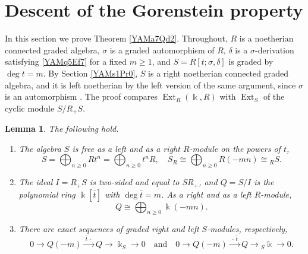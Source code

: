\documentclass[reqno]{amsart}
\numberwithin{equation}{section}
\newtheorem{lemma}[equation]{Lemma}
\theoremstyle{definition}
\theoremstyle{remark}
\theoremstyle{plain}
\newcommand{\kk}{\Bbbk}
\DeclareMathOperator{\Ext}{Ext}
\begin{document}
\section{Descent of the Gorenstein property}\label{YAMs1Pz4}

In this section we prove Theorem \ref{YAMa7Qd2}. Throughout, $R$ is a noetherian connected graded algebra, $\sigma$ is a graded automorphism of $R$, $\delta$ is a $\sigma$-derivation satisfying \eqref{YAMq5Ef7} for a fixed $m\ge1$, and $S=R[t;\sigma,\delta]$ is graded by $\deg t=m$. By Section \ref{YAMs1Pr0}, $S$ is a right noetherian connected graded algebra, and it is left noetherian by the left version of the same argument, since $\sigma$ is an automorphism \cite[Theorem 1.2.9]{MR}. The proof compares $\Ext_R(\kk,R)$ with $\Ext_S$ of the cyclic module $S/R_+S$.

\begin{lemma}\label{YAMl5Gd0}
The following hold.
\begin{enumerate}
\item The algebra $S$ is free as a left and as a right $R$-module on the powers of $t$,
\begin{equation}\label{YAMe15Fr6}
S=\bigoplus_{n\ge0}Rt^n=\bigoplus_{n\ge0}t^nR,\quad S_R\cong\bigoplus_{n\ge0}R(-mn)\cong{}_RS.
\end{equation}
\item The ideal $I=R_+S$ is two-sided and equal to $SR_+$, and $Q=S/I$ is the polynomial ring $\kk[\bar t]$ with $\deg\bar t=m$. As a right and as a left $R$-module,
\begin{equation}\label{YAMe16Qr7}
Q\cong\bigoplus_{n\ge0}\kk(-mn).
\end{equation}
\item There are exact sequences of graded right and left $S$-modules, respectively,
\begin{equation}\label{YAMe17Ex8}
0\to Q(-m)\xrightarrow{\ \bar t\,\cdot\ }Q\to\kk_S\to0\quad\text{and}\quad0\to Q(-m)\xrightarrow{\ \cdot\,\bar t\ }Q\to{}_S\kk\to0.
\end{equation}
\end{enumerate}
\end{lemma}
\end{document}
